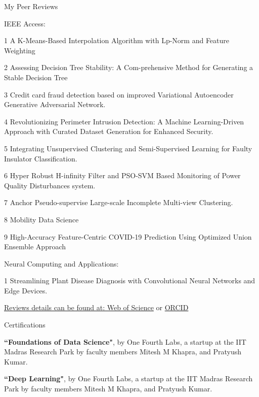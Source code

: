 \documentclass{resume} %
\begin{document}
\begin{rSection}{My Peer Reviews}
	
	\begin{rSubsection}{IEEE Access:}{}{}{}	
		\item[1] A K-Means-Based Interpolation Algorithm with Lp-Norm and Feature Weighting
		\item[2] Assessing Decision Tree Stability: A Com-prehensive Method for Generating a Stable Decision Tree
		\item[3] Credit card fraud detection based on improved Variational Autoencoder Generative Adversarial Network.
		\item[4] Revolutionizing Perimeter Intrusion Detection: A Machine Learning-Driven Approach with Curated Dataset Generation for Enhanced Security.
		\item[5] Integrating Unsupervised Clustering and Semi-Supervised
		Learning for Faulty Insulator Classification.
		\item[6] Hyper Robust H-infinity Filter and PSO-SVM Based Monitoring of Power Quality Disturbances system.
		\item[7] Anchor Pseudo-supervise Large-scale Incomplete Multi-view Clustering.
		\item[8] Mobility Data Science
		\item[9] High-Accuracy Feature-Centric COVID-19 Prediction Using Optimized Union Ensemble Approach
	\end{rSubsection}
	\begin{rSubsection}{Neural Computing and Applications:}{}{}{}		
		\item[1] Streamlining Plant Disease Diagnosis with Convolutional Neural Networks and Edge	Devices.
	\end{rSubsection}
	 \href{https://www.webofscience.com/wos/author/record/IUN-0908-2023}{Reviews details can be found at: Web of Science} or \href{https://orcid.org/0000-0001-8482-7678}{ ORCID}
\end{rSection}


\begin{rSection}{Certifications}
	
	\begin{rSubsection}{}{}{}{}
		\item \textbf{``Foundations of Data Science"},  by One Fourth Labs, a startup at the IIT Madras Research Park by faculty members Mitesh M Khapra, and Pratyush Kumar.
		\item \textbf{``Deep Learning"}, by One Fourth Labs, a startup at the IIT Madras Research Park by faculty members Mitesh M Khapra, and Pratyush Kumar.
		
	\end{rSubsection}
	
\end{rSection}
\end{document}
